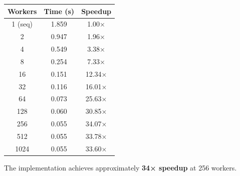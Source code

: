 \begin{table}[H]
    \centering
    \begin{tabular}{|c|c|c|}
        \hline
        \textbf{Workers} & \textbf{Time (s)} & \textbf{Speedup} \\
        \hline
        1 (seq)          & 1.859             & 1.00×            \\
        \hline
        2                & 0.947             & 1.96×            \\
        \hline
        4                & 0.549             & 3.38×            \\
        \hline
        8                & 0.254             & 7.33×            \\
        \hline
        16               & 0.151             & 12.34×           \\
        \hline
        32               & 0.116             & 16.01×           \\
        \hline
        64               & 0.073             & 25.63×           \\
        \hline
        128              & 0.060             & 30.85×           \\
        \hline
        256              & 0.055             & 34.07×           \\
        \hline
        512              & 0.055             & 33.78×           \\
        \hline
        1024             & 0.055             & 33.60×           \\
        \hline
    \end{tabular}
\end{table}

The implementation achieves approximately \textbf{34× speedup} at 256 workers.
